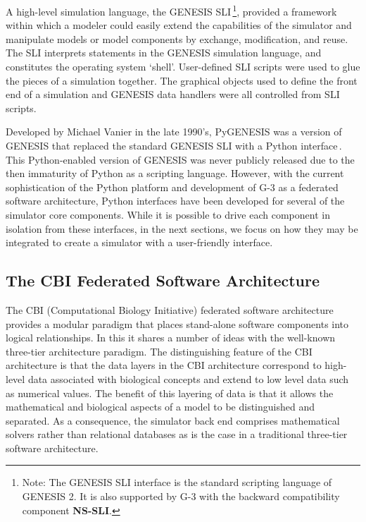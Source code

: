 \documentclass[12pt]{article}
\begin{document}
A high-level simulation language, the GENESIS SLI\,\footnote{Note: The
  GENESIS SLI interface is the standard scripting language of GENESIS
  2. It is also supported by G-3 with the backward compatibility
  component {\bf NS-SLI}.}, provided a framework within which a
modeler could easily extend the capabilities of the simulator and
manipulate models or model components by exchange, modification, and
reuse. The SLI interprets statements in the GENESIS simulation
language, and constitutes the operating system `shell'. User-defined
SLI scripts were used to glue the pieces of a simulation together. The
graphical objects used to define the front end of a simulation and
GENESIS data handlers were all controlled from SLI scripts.

Developed by Michael Vanier in the late 1990's, PyGENESIS was a
version of GENESIS that replaced the standard GENESIS SLI with a
Python interface\,\cite{vanier97:_genes_python}.  This Python-enabled
version of GENESIS was never publicly released due to the then
immaturity of Python as a scripting language.  However, with the
current sophistication of the Python platform and development of G-3
as a federated software architecture, Python interfaces have been
developed for several of the simulator core components.  While it is
possible to drive each component in isolation from these interfaces,
in the next sections, we focus on how they may be integrated to create
a simulator with a user-friendly interface.


\subsection{The CBI Federated Software Architecture}

The CBI (Computational Biology Initiative) federated software
architecture provides a modular paradigm that places stand-alone
software components into logical relationships.
In this it shares a number of ideas with the well-known three-tier
architecture paradigm\cite{Eckerson1995}.  The distinguishing feature
of the CBI architecture is that the data layers in the CBI
architecture correspond to high-level data associated with biological
concepts and extend to low level data such as numerical values.  The
benefit of this layering of data is that it allows the mathematical
and biological aspects of a model to be distinguished and separated.
As a consequence, the simulator back end comprises mathematical solvers
rather than relational databases as is the case in a traditional
three-tier software architecture.
\end{document}
